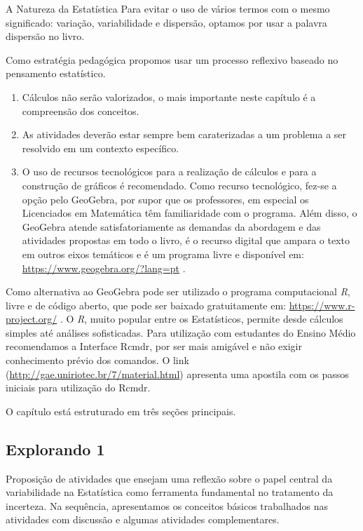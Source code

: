\begin{apresentacao}{A Natureza da Estatística}
Para evitar o uso de vários termos com o mesmo significado: variação, variabilidade e dispersão, optamos por usar a palavra dispersão no livro.

Como estratégia pedagógica propomos usar um processo reflexivo baseado no pensamento estatístico.
\begin{enumerate}
\item {} 
Cálculos não serão valorizados, o mais importante neste capítulo é a compreensão dos conceitos.

\item {} 
As atividades deverão estar sempre bem caraterizadas a um problema a ser resolvido em um contexto específico.

\item {} 
O uso de recursos tecnológicos para a realização de cálculos e para a construção de gráficos é recomendado. Como recurso tecnológico, fez-se a opção pelo GeoGebra, por supor que os professores, em especial os Licenciados em Matemática têm familiaridade com o programa. Além disso, o GeoGebra atende satisfatoriamente as demandas da abordagem e das atividades propostas em todo o livro, é o recurso digital que ampara o texto em outros eixos temáticos e é um programa livre e disponível em: \url{https://www.geogebra.org/?lang=pt} .

\end{enumerate}

Como alternativa ao GeoGebra pode ser utilizado o programa computacional \textit{R}, livre e de código aberto, que pode ser baixado gratuitamente em: \url{https://www.r-project.org/} . O \textit{R}, muito popular entre os Estatísticos, permite desde cálculos simples até análises sofisticadas. Para utilização com estudantes do Ensino Médio recomendamos a Interface Rcmdr, por ser mais amigável e não exigir conhecimento prévio dos comandos. O link (\url{http://gae.uniriotec.br/7/material.html}) apresenta uma apostila com os passos iniciais para utilização do Rcmdr.

O capítulo está estruturado em três seções principais.


\subsection{Explorando 1} Proposição de atividades que ensejam uma reflexão sobre o papel central da variabilidade na Estatística como ferramenta fundamental no tratamento da incerteza. Na sequência,  apresentamos os conceitos básicos trabalhados nas atividades com discussão e algumas atividades complementares.


\end{apresentacao}
